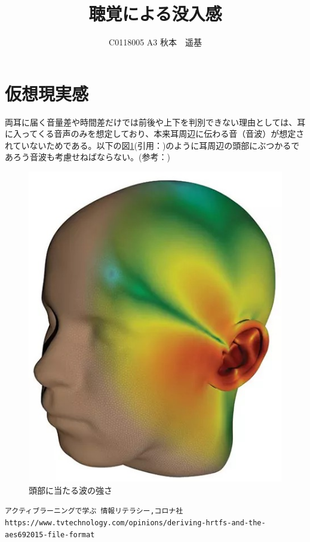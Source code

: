 \documentclass[uplatex]{jsarticle} %
\title{聴覚による没入感}
\author{C0118005 A3 秋本　遥基}
\date{}
\begin{document}
\maketitle

\section{仮想現実感}

  両耳に届く音量差や時間差だけでは前後や上下を判別できない理由としては、耳に入ってくる音声のみを想定しており、本来耳周辺に伝わる音（音波）が想定されていないためである。以下の図\ref{fig}(引用：\cite{item})のように耳周辺の頭部にぶつかるであろう音波も考慮せねばならない。(参考：\cite{sour})

\begin{figure}[H]
  \centering
  \includegraphics[scale= 0.3]{./mimi.jpg}
  \caption{頭部に当たる波の強さ}
  \label{fig}
\end{figure}

\begin{thebibliography}{99}
   \verb+アクティブラーニングで学ぶ 情報リテラシー,コロナ社+
   \verb+https://www.tvtechnology.com/opinions/deriving-hrtfs-and-the-aes692015-file-format+
\end{thebibliography}
\end{document}
